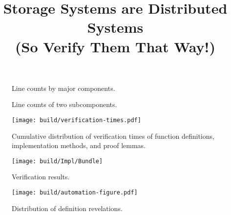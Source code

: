\documentclass[10pt,twocolumn]{article}
\title{\vspace{-2mm}
Storage Systems are Distributed Systems\\
(So Verify Them That Way!)
\\\vspace{2mm}{\large\textbf{OSDI 2020 Artifact Reprodcubility Experiment Results}}
}
\date{}
\begin{document}
\maketitle



\begin{figure}
\begin{center}

\end{center}
  \vspace{-3mm}
\caption{Line counts by major components.}
\label{line-counts}
\end{figure}

\begin{figure}
  \begin{center}
    
  \end{center}
  \vspace{-3mm}
  \caption{Line counts of two subcomponents.
  }
  \label{line-counts-micro}
  \vspace{-2mm}
\end{figure}

\begin{figure}
\texttt{[image: build/verification-times.pdf]}
  \vspace{-5mm}
\caption{Cumulative distribution of verification times of function
  definitions, implementation methods, and proof lemmas.
  }
  \vspace{-4mm}
\label{verification-times}
\end{figure}

\begin{figure*}
\texttt{[image: build/Impl/Bundle]}
\caption{Verification results.}
\label{verification-results}
\end{figure*}

\begin{figure}
\texttt{[image: build/automation-figure.pdf]}
  \vspace{-4mm}
  \caption{Distribution of definition revelations.}
  \vspace{-3mm}
\label{automation-histogram}
\end{figure}

\newcommand{\ycsbHddDataDir}{data/ycsb-hdd/golden}
\newcommand{\ycsbSsdDataDir}{data/ycsb-ssd/golden}
\newcommand{\mutablebtreeDataDir}{data/mutablebtree/silver}

\end{document}
